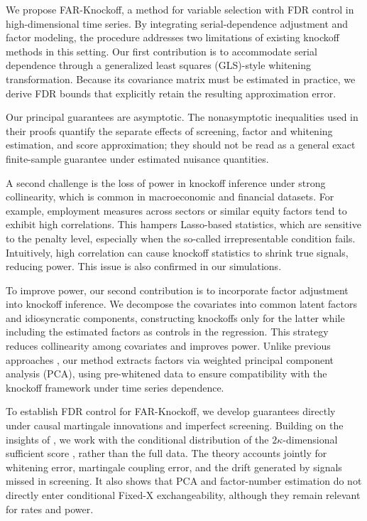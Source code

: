 ﻿\documentclass[12pt]{article}
\newcommand{\0}{\mbox{\bf 0}}
\theoremstyle{plain}%
\theoremstyle{definition}
\begin{document}
{\color{minorrevisionred}
We propose FAR-Knockoff, a method for variable selection with FDR control in
high-dimensional time series. By integrating serial-dependence adjustment and
factor modeling, the procedure addresses two limitations of existing knockoff
methods in this setting. Our first contribution is to accommodate serial
dependence through a generalized least squares (GLS)-style whitening
transformation. Because its covariance matrix must be estimated in practice,
we derive FDR bounds that explicitly retain the resulting approximation error.
}

{\color{minorrevisionred}
Our principal guarantees are asymptotic. The nonasymptotic inequalities used
in their proofs quantify the separate effects of screening, factor and
whitening estimation, and score approximation; they should not be read as a
general exact finite-sample guarantee under estimated nuisance quantities.
}

A second challenge is the loss of power in knockoff inference under strong collinearity, which is common in macroeconomic and financial datasets. For example, employment measures across sectors or similar equity factors tend to exhibit high correlations. This hampers Lasso-based statistics, which are sensitive to the penalty level, especially when the so-called irrepresentable condition fails. Intuitively, high correlation can cause knockoff statistics to shrink true signals, reducing power. This issue is also confirmed in our simulations.

To improve power, our second contribution is to incorporate factor adjustment into knockoff inference. We decompose the covariates into common latent factors and idiosyncratic components, constructing knockoffs only for the latter while including the estimated factors as controls in the regression. This strategy reduces collinearity among covariates and improves power. Unlike previous approaches 
\citep[e.g.][]{FanKeWang2020}, our method extracts factors via weighted principal component analysis (PCA), using pre-whitened data to ensure compatibility with the knockoff framework under time series dependence.

{\color{red}
To establish FDR control for FAR-Knockoff, we develop guarantees directly
under causal martingale innovations and imperfect screening.  Building on
the insights of \citet{BarberCandesSamworth2020}, we work with the
conditional distribution of the $2\kappa$-dimensional sufficient score
\citep{ChenHeChuEtal2024}, rather than the full data.  The theory accounts
jointly for whitening error, martingale coupling error, and the drift
generated by signals missed in screening.  It also shows that PCA and
factor-number estimation do not directly enter conditional Fixed-X
exchangeability, although they remain relevant for rates and power.
}
\end{document}
